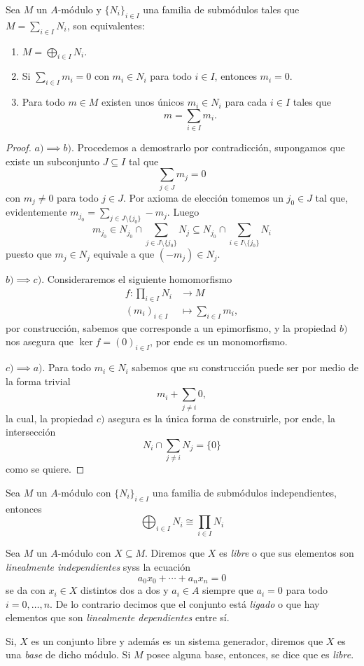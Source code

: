 \documentclass[11pt,oneside]{book}
\begin{document}
\begin{thm}\label{thm:module-bases-properties}
Sea $M$ un $A$-módulo y $\{N_i\}_{i\in I}$ una familia de submódulos tales que $M=\sum_{i\in I}N_i$, son equivalentes:
\begin{enumerate}[$a)$]
	\item $M=\bigoplus_{i\in I}N_i$.
	\item Si $\sum_{i\in I}m_i=0$ con $m_i\in N_i$ para todo $i\in I$, entonces $m_i=0$.
	\item Para todo $m\in M$ existen unos únicos $m_i\in N_i$ para cada $i\in I$ tales que
	$$m=\sum_{i\in I}m_i.$$
\end{enumerate}
\end{thm}
\begin{proof}
$a)\implies b)$. Procedemos a demostrarlo por contradicción, supongamos que existe un subconjunto $J\subseteq I$ tal que
$$\sum_{j\in J}m_j=0$$
con $m_j\neq 0$ para todo $j\in J$. Por axioma de elección tomemos un $j_0\in J$ tal que, evidentemente $m_{j_0}=\sum_{j\in J\setminus\{j_0\}}-m_j$. Luego
$$m_{j_0}\in N_{j_0}\cap\sum_{j\in J\setminus\{j_0\}}N_j\subseteq N_{j_0}\cap\sum_{i\in I\setminus\{j_0\}}N_i$$
puesto que $m_j\in N_j$ equivale a que $(-m_j)\in N_j$.

$b)\implies c)$. Consideraremos el siguiente homomorfismo
\begin{align*}
f:\prod_{i\in I}N_i&\longrightarrow M\\
(m_i)_{i\in I}&\longmapsto\sum_{i\in I}m_i,
\end{align*}
por construcción, sabemos que corresponde a un epimorfismo, y la propiedad $b)$ nos asegura que $\ker f=(0)_{i\in I}$, por ende es un monomorfismo.

$c)\implies a)$. Para todo $m_i\in N_i$ sabemos que su construcción puede ser por medio de la forma trivial
$$m_i+\sum_{j\neq i}0,$$
la cual, la propiedad $c)$ asegura es la única forma de construirle, por ende, la intersección
$$N_i\cap\sum_{j\neq i}N_j=\{0\}$$
como se quiere.
\end{proof}
\begin{thm}
Sea $M$ un $A$-módulo con $\{N_i\}_{i\in I}$ una familia de submódulos independientes, entonces
$$\bigoplus_{i\in I}N_i\cong\prod_{i\in I}N_i$$
\end{thm}
\begin{mydef}
Sea $M$ un $A$-módulo con $X\subseteq M$. Diremos que $X$ es \textit{libre} o que sus elementos son \textit{linealmente independientes} syss la ecuación
$$a_0x_0+\cdots+a_nx_n=0$$
se da con $x_i\in X$ distintos dos a dos y $a_i\in A$ siempre que $a_i=0$ para todo $i=0,\dots,n$. De lo contrario decimos que el conjunto está \textit{ligado} o que hay elementos que son \textit{linealmente dependientes} entre sí.

Si, $X$ es un conjunto libre y además es un sistema generador, diremos que $X$ es una \textit{base} de dicho módulo. Si $M$ posee alguna base, entonces, se dice que es \textit{libre}.
\end{mydef}
\end{document}
